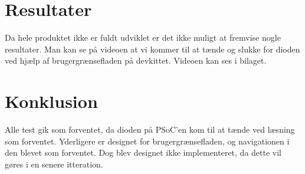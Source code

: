 \section*{Resultater}

Da hele produktet ikke er fuldt udviklet er det ikke muligt at fremvise nogle resultater. Man kan se på videoen at vi kommer til at tænde og slukke for dioden ved hjælp af brugergrænsefladen på devkittet. Videoen kan ses i bilaget.

\section*{Konklusion}

Alle test gik som forventet, da dioden på PSoC'en kom til at tænde ved læsning som forventet. Yderligere er designet for brugergrænsefladen, og navigationen i den blevet som forventet. Dog blev designet ikke implementeret, da dette vil gøres i en senere itteration.